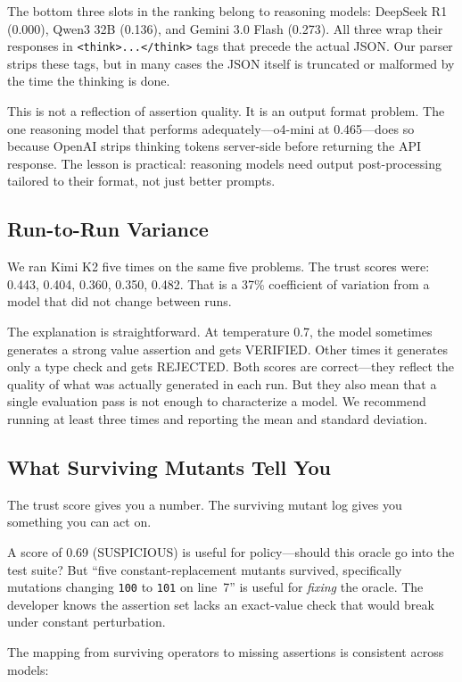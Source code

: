 \documentclass[conference]{IEEEtran}
\begin{document}
The bottom three slots in the ranking belong to reasoning models: DeepSeek R1 (0.000), Qwen3 32B (0.136), and Gemini 3.0 Flash (0.273). All three wrap their responses in \texttt{<think>...</think>} tags that precede the actual JSON. Our parser strips these tags, but in many cases the JSON itself is truncated or malformed by the time the thinking is done.

This is not a reflection of assertion quality. It is an output format problem. The one reasoning model that performs adequately---o4-mini at 0.465---does so because OpenAI strips thinking tokens server-side before returning the API response. The lesson is practical: reasoning models need output post-processing tailored to their format, not just better prompts.

\subsection{Run-to-Run Variance}

We ran Kimi K2 five times on the same five problems. The trust scores were: 0.443, 0.404, 0.360, 0.350, 0.482. That is a 37\% coefficient of variation from a model that did not change between runs.

The explanation is straightforward. At temperature 0.7, the model sometimes generates a strong value assertion and gets VERIFIED. Other times it generates only a type check and gets REJECTED. Both scores are correct---they reflect the quality of what was actually generated in each run. But they also mean that a single evaluation pass is not enough to characterize a model. We recommend running at least three times and reporting the mean and standard deviation.

\subsection{What Surviving Mutants Tell You}

The trust score gives you a number. The surviving mutant log gives you something you can act on.

A score of 0.69 (SUSPICIOUS) is useful for policy---should this oracle go into the test suite? But ``five constant-replacement mutants survived, specifically mutations changing \texttt{100} to \texttt{101} on line~7'' is useful for \emph{fixing} the oracle. The developer knows the assertion set lacks an exact-value check that would break under constant perturbation.

The mapping from surviving operators to missing assertions is consistent across models:
\end{document}
